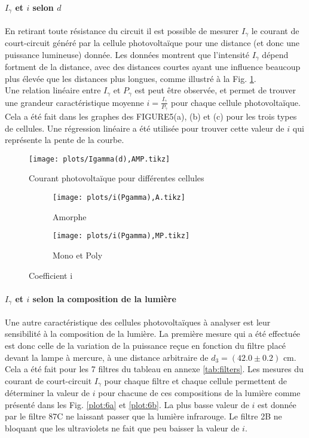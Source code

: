 \paragraph*{\(I_\gamma\) et \(i\) selon \(d\)}
En retirant toute résistance du circuit il est possible de mesurer \(I_\gamma\) le courant de court-circuit généré par la cellule photovoltaïque pour une distance (et donc une puissance lumineuse) donnée. Les données montrent que l'intensité \(I_\gamma\) dépend fortment de la distance, avec des distances courtes ayant une influence beaucoup plus élevée que les distances plus longues, comme illustré à la Fig. \ref{plot:4}. \\
Une relation linéaire entre \(I_\gamma\) et \(P_\gamma\) est peut être observée, et permet de trouver une grandeur caractéristique moyenne \(i = \frac{I_\gamma}{P_\gamma}\) pour chaque cellule photovoltaïque. Cela a été fait dans les graphes des FIGURE5(a), (b) et (c) pour les trois types de cellules. Une régression linéaire a été utilisée pour trouver cette valeur de \(i\) qui représente la pente de la courbe.

\begin{figure}
    \centering
    \texttt{[image: plots/Igamma(d),AMP.tikz]}
    \caption{Courant photovoltaïque pour différentes cellules}
    \label{plot:4}
\end{figure}

\begin{figure}
    \centering
    \begin{subfigure}[t]{0.45\linewidth}
        \centering
        \texttt{[image: plots/i(Pgamma),A.tikz]}
        \caption{Amorphe}
        \label{plot:5a}
    \end{subfigure}
    \begin{subfigure}[t]{0.45\linewidth}
        \centering
        \texttt{[image: plots/i(Pgamma),MP.tikz]}
        \caption{Mono et Poly}
        \label{plot:5b}
    \end{subfigure}
    \caption{Coefficient i}
    \label{plot:5}
\end{figure}

\paragraph*{\(I_\gamma\) et \(i\) selon la composition de la lumière}
Une autre caractéristique des cellules photovoltaïques à analyser est leur sensibilité à la composition de la lumière. La première mesure qui a été effectuée est donc celle de la variation de la puissance reçue en fonction du filtre placé devant la lampe à mercure, à une distance arbitraire de \(d_3 = (42.0 \pm 0.2)\) \unit{\centi\meter}. Cela a été fait pour les 7 filtres du tableau en annexe \ref{tab:filters}. Les mesures du courant de court-circuit \(I_\gamma\) pour chaque filtre et chaque cellule permettent de déterminer la valeur de \(i\) pour chacune de ces compositions de la lumière comme présenté dans les Fig. \ref{plot:6a} et \ref{plot:6b}. La plus basse valeur de \(i\) est donnée par le filtre 87C ne laissant passer que la lumière infrarouge. Le filtre 2B ne bloquant que les ultraviolets ne fait que peu baisser la valeur de \(i\).

